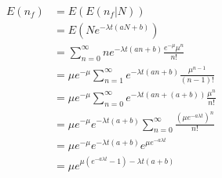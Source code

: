 \documentclass[12pt, oneside]{article}
\begin{document}
\begin{enumerate}
{    \begin{align*}
        E(n_f) &= E(E(n_f | N)) \\
               &= E(N e^{-\lambda t(aN + b)}) \\
               &= \sum_{n = 0}^{\infty} n e^{-\lambda t(an + b)} \frac{e^{-\mu} \mu^n}{n!} \\
               &= \mu e^{-\mu} \sum_{n = 1}^{\infty} e^{-\lambda t(an + b)} \frac{\mu^{n-1}}{(n-1)!} \\
               &= \mu e^{-\mu} \sum_{n = 0}^{\infty} e^{-\lambda t(an + (a + b))} \frac{\mu^{n}}{n!} \\
               &= \mu e^{-\mu} e^{-\lambda t(a + b)} \sum_{n = 0}^{\infty} \frac{(\mu e^{-a \lambda t})^n}{n!} \\
               &= \mu e^{-\mu} e^{-\lambda t(a + b)} e^{\mu e^{-a \lambda t}} \\
               &= \mu e^{\mu(e^{-a \lambda t} - 1) - \lambda t (a + b)}
    \end{align*}
}



\end{enumerate}
\end{document}
